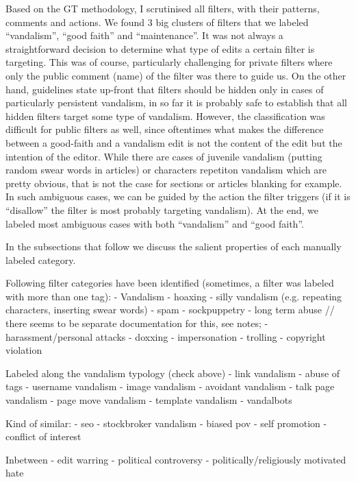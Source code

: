 Based on the GT methodology, I scrutinised all filters, with their patterns, comments and actions. %
We found 3 big clusters of filters that we labeled ``vandalism'', ``good faith'' and ``maintenance''.
It was not always a straightforward decision to determine what type of edits a certain filter is targeting.
This was of course, particularly challenging for private filters where only the public comment (name) of the filter was there to guide us.
On the other hand, guidelines state up-front that filters should be hidden only in cases of particularly persistent vandalism, in so far it is probably safe to establish that all hidden filters target some type of vandalism.
However, the classification was difficult for public filters as well, since oftentimes what makes the difference between a good-faith and a vandalism edit is not the content of the edit but the intention of the editor.
While there are cases of juvenile vandalism (putting random swear words in articles) or characters repetiton vandalism which are pretty obvious, that is not the case for sections or articles blanking for example. %
In such ambiguous cases, we can be guided by the action the filter triggers (if it is ``disallow'' the filter is most probably targeting vandalism).
At the end, we labeled most ambiguous cases with both ``vandalism'' and ``good faith''.

In the subsections that follow we discuss the salient properties of each manually labeled category.


Following filter categories have been identified (sometimes, a filter was labeled with more than one tag):
- Vandalism
  - hoaxing
  - silly vandalism (e.g. repeating characters, inserting swear words)
  - spam
  - sockpuppetry
  - long term abuse // there seems to be separate documentation for this, see notes;
  - harassment/personal attacks
    - doxxing
    - impersonation
  - trolling
  - copyright violation

  Labeled along the vandalism typology (check above)
  - link vandalism
  - abuse of tags
  - username vandalism
  - image vandalism
  - avoidant vandalism
  - talk page vandalism
  - page move vandalism
  - template vandalism
  - vandalbots

  Kind of similar:
  - seo
  - stockbroker vandalism
  - biased pov
  - self promotion
  - conflict of interest

Inbetween
- edit warring
- political controversy
- politically/religiously motivated hate

